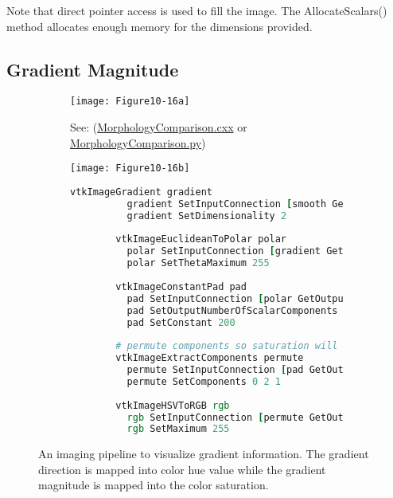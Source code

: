 Note that direct pointer access is used to fill the image. The AllocateScalars() method allocates enough memory for the dimensions provided.

\subsection{Gradient Magnitude}

\begin{figure}[htb]
    \centering
	\begin{subfigure}[h]{0.38\linewidth}
		\texttt{[image: Figure10-16a]}
		\captionsetup{justification=centering}
		\caption*{See: (\href{https://lorensen.github.io/VTKExamples/site/Cxx/ImageProcessing/MorphologyComparison/}{MorphologyComparison.cxx} or \href{https://lorensen.github.io/VTKExamples/site/Python/ImageProcessing/MorphologyComparison/}{MorphologyComparison.py})}
		\label{fig:Figure10-16a}
	\end{subfigure}
	\hfill
	\begin{subfigure}[h]{0.38\linewidth}
		\texttt{[image: Figure10-16b]}
		\captionsetup{justification=centering}
		\caption*{}
        \label{fig:Figure10-16b}
	\end{subfigure}
	\hfill
	\begin{subfigure}[h]{0.78\linewidth}
       \begin{lstlisting}[language=TCL,  caption={}, numbers=none, frame=none]
        vtkImageGradient gradient
          gradient SetInputConnection [smooth GetOutputPort]
          gradient SetDimensionality 2
        
        vtkImageEuclideanToPolar polar
          polar SetInputConnection [gradient GetOutputPort]
          polar SetThetaMaximum 255
        
        vtkImageConstantPad pad
          pad SetInputConnection [polar GetOutputPort]
          pad SetOutputNumberOfScalarComponents 3
          pad SetConstant 200
        
        # permute components so saturation will be constant
        vtkImageExtractComponents permute
          permute SetInputConnection [pad GetOutputPort]
          permute SetComponents 0 2 1
          
        vtkImageHSVToRGB rgb
          rgb SetInputConnection [permute GetOutputPort]
          rgb SetMaximum 255
          \end{lstlisting}
        \label{fig:Figure10-16d}
	\end{subfigure}
	\caption{An imaging pipeline to visualize gradient information. The gradient direction is mapped into color hue value while the gradient magnitude is mapped into the color saturation.}\label{fig:Figure10-16}
\end{figure}

